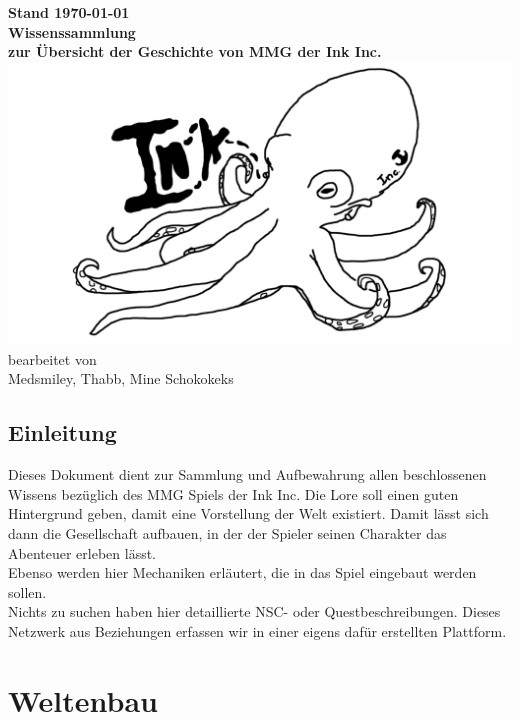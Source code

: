 \documentclass[a4paper,12pt,%
headsepline,%
numbers=noenddot,%
]{scrreprt}
\begin{document}
\begin{titlepage}
	\centering
	\vfill
	\Large{\textbf{Stand {\today}}} \\ \bigskip
	\vfill
	\textsf{\textbf{\Huge{Wissenssammlung}}} \\ \bigskip
	\Large{\textbf{zur Übersicht der Geschichte von MMG der Ink Inc.}} \\ \bigskip
	\vfill
	\includegraphics[width=\linewidth]{Abbildungen/logo.png} \\ \bigskip
	\vfill
	\large
	bearbeitet von\\
	Medsmiley, Thabb, Mine Schokokeks
\end{titlepage}

\tableofcontents
\listoffigures



\chapter*{Einleitung}
Dieses Dokument dient zur Sammlung und Aufbewahrung allen beschlossenen Wissens bezüglich des MMG Spiels der Ink Inc. Die Lore soll einen guten Hintergrund geben, damit eine Vorstellung der Welt existiert. Damit lässt sich dann die Gesellschaft aufbauen, in der der Spieler seinen Charakter das Abenteuer erleben lässt. \\
Ebenso werden hier Mechaniken erläutert, die in das Spiel eingebaut werden sollen. \\

Nichts zu suchen haben hier detaillierte NSC- oder Questbeschreibungen. Dieses Netzwerk aus Beziehungen erfassen wir in einer eigens dafür erstellten Plattform. 

\part{Weltenbau}
 
 

\end{document}
